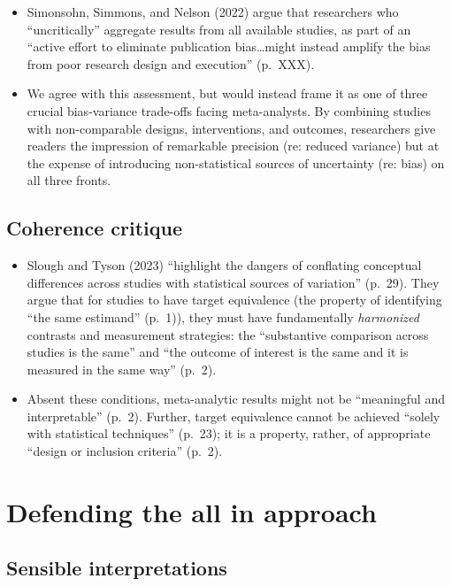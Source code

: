 \documentclass{article}
\begin{document}
\begin{itemize}
\item
  Simonsohn, Simmons, and Nelson (2022) argue that researchers who
  ``uncritically'' aggregate results from all available studies, as part
  of an ``active effort to eliminate publication bias\ldots might
  instead amplify the bias from poor research design and execution''
  (p.~XXX).
\item
  We agree with this assessment, but would instead frame it as one of
  three crucial bias-variance trade-offs facing meta-analysts. By
  combining studies with non-comparable designs, interventions, and
  outcomes, researchers give readers the impression of remarkable
  precision (re: reduced variance) but at the expense of introducing
  non-statistical sources of uncertainty (re: bias) on all three fronts.
\end{itemize}

\subsection{Coherence critique}\label{coherence-critique}

\begin{itemize}
\item
  Slough and Tyson (2023) ``highlight the dangers of conflating
  conceptual differences across studies with statistical sources of
  variation'' (p.~29). They argue that for studies to have target
  equivalence (the property of identifying ``the same estimand''
  (p.~1)), they must have fundamentally \emph{harmonized} contrasts and
  measurement strategies: the ``substantive comparison across studies is
  the same'' and ``the outcome of interest is the same and it is
  measured in the same way'' (p.~2).
\item
  Absent these conditions, meta-analytic results might not be
  ``meaningful and interpretable'' (p.~2). Further, target equivalence
  cannot be achieved ``solely with statistical techniques'' (p.~23); it
  is a property, rather, of appropriate ``design or inclusion criteria''
  (p.~2).
\end{itemize}

\section{Defending the all in
approach}\label{defending-the-all-in-approach}

\subsection{Sensible interpretations}\label{sensible-interpretations}
\end{document}
